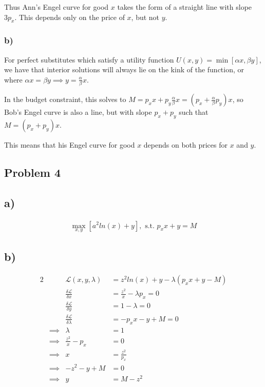 \documentclass[12pt,letterpaper]{article}
\theoremstyle{definition}
\newcommand{\Lag}{\mathcal{L}}
\begin{document}
Thus Ann's Engel curve for good $x$ takes the form of a straight line with slope $3p_x$.
This depends only on the price of $x$, but not $y$.

\subsubsection*{b)}

For perfect substitutes which satisfy a utility function $U(x,y) = \min[\alpha x, \beta y]$,
we have that interior solutions will always lie on the kink of the function,
or where $\alpha x = \beta y \implies y = \frac{\alpha}{\beta}x$.

In the budget constraint, this solves to $M = p_xx + p_y\frac{\alpha}{\beta}x =
(p_x + \frac{\alpha}{\beta}p_y)x$, so Bob's Engel curve is also a line, but
with slope $p_x+p_y$ such that $M = (p_x +p_y)x$.

This means that his Engel curve for good $x$ depends on both prices for $x$ and $y$.


\subsection*{Problem 4}
\subsection*{a)}
\begin{align*}
    \max_{x,y}[a^2ln(x) + y], \text{ s.t. } p_xx + y = M
\end{align*}

\subsection*{b)}

\begin{alignat*}{2}
    &&\Lag (x,y,\lambda) &= z^2ln(x) + y - \lambda(p_xx + y - M) \\
    &&\frac{\delta \Lag}{\delta x} &= \frac{z^2}{x} - \lambda p_x = 0 \\
    &&\frac{\delta \Lag}{\delta y} &= 1 - \lambda  = 0 \\
    &&\frac{\delta \Lag}{\delta \lambda} &= -p_xx - y + M = 0 \\
    &\implies& \lambda &= 1\\
    &\implies& \frac{z^2}{x} - p_x &= 0 \\
    &\implies& x &= \frac{z^2}{p_x} \\
    &\implies& -z^2 - y + M &= 0 \\
    &\implies& y &= M - z^2 \\
\end{alignat*}
\end{document}

